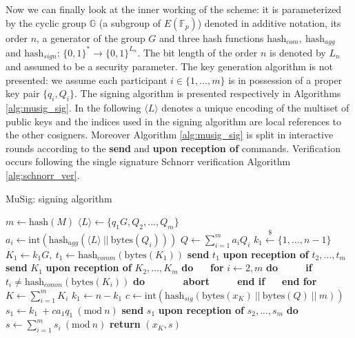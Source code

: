 \bigskip
\noindent
Now we can finally look at the inner working of the scheme: it is parameterized by the cyclic group $\mathbb{G}$ (a subgroup of $E(\mathbb{F}_p)$) denoted in additive notation, its order $n$, a generator of the group $G$ and three hash functions $\text{hash}_{com}, \ \text{hash}_{agg}$ and $\text{hash}_{sign}$: $\{0, 1\}^* \to \{0, 1\}^{L_n}$. The bit length of the order $n$ is denoted by $L_n$ and assumed to be a security parameter. The key generation algorithm is not presented: we assume each participant $i \in \{1, ..., m\}$ is in possession of a proper key pair $\{q_i, Q_i\}$. The signing algorithm is presented respectively in Algorithms \ref{alg:musig_sig}. In the following $\langle L \rangle$ denotes a unique encoding of the multiset of public keys and the indices used in the signing algorithm are local references to the other cosigners. Moreover Algorithm \ref{alg:musig_sig} is split in interactive rounds according to the \textbf{send} and \textbf{upon reception of} commands. Verification occurs following the single signature Schnorr verification Algorithm \ref{alg:schnorr_ver}.

\bigskip

\begin{algorithm}
	\caption{MuSig: signing algorithm}
	\label{alg:musig_sig}
	\begin{algorithmic}[1]
		\State $m \gets \text{hash}(M)$
		\State $\langle L \rangle \gets \{q_1G, Q_2, ..., Q_m\}$
		\State $a_i \gets \text{int}(\text{hash}_{agg}(\langle L \rangle \ || \ \text{bytes}(Q_i)))$
		\EndFor
		\State $Q \gets \sum_{i = 1}^{m}a_iQ_i$
		\State $k_1 \xleftarrow{\text{\$}} \{1, ..., n - 1\}$
		\State $K_1 \gets k_1G, \ t_1 \gets \text{hash}_{comm}(\text{bytes}(K_1))$
		\State \textbf{send} $t_1$
		\State \textbf{upon reception of} $t_2, ..., t_m$ \textbf{send} $K_1$
		\State \textbf{upon reception of} $K_2, ..., K_m$ \textbf{do}
		\State $\ \ \ \ \ $ \textbf{for} $i \gets 2, m$ \textbf{do}
		\State $\ \ \ \ \ \ \ \ \ \ $ \textbf{if} $t_i \neq \text{hash}_{comm}(\text{bytes}(K_i))$ \textbf{do}
		\State $\ \ \ \ \ \ \ \ \ \ \ \ \ \ \ $ \textbf{abort}
		\State $\ \ \ \ \ \ \ \ \ \ $ \textbf{end if}
		\State $\ \ \ \ \ $ \textbf{end for} 
		\State $K \gets \sum_{i = 1}^{m}K_i$
		\State $k_1 \gets n - k_1$
		\EndIf
		\State $c \gets \text{int}(\text{hash}_{sig}(\text{bytes}(x_K) \ || \ \text{bytes}(Q) \ || \ m))$
		\State $s_1 \gets k_1\ + ca_1q_1 \ (\text{mod} \ n)$
		\State \textbf{send} $s_1$
		\State \textbf{upon reception of} $s_2, ..., s_m$ \textbf{do}
		\State $s \gets \sum_{i = 1}^{m}s_i \ (\text{mod} \ n)$
		\State \textbf{return} $(x_K, s)$
		\EndProcedure
	\end{algorithmic}
\end{algorithm}

